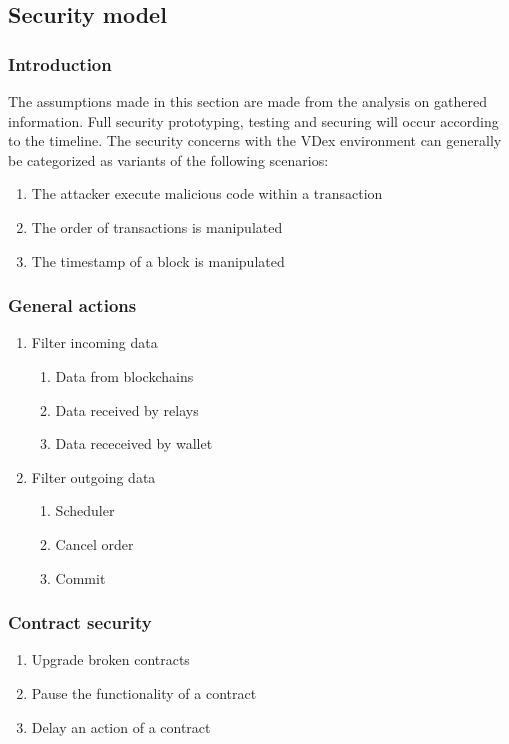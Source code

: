 \documentclass[]{article}
\begin{document}
\subsection{Security model}
\subsubsection{Introduction}
The assumptions made in this section are made from the analysis 
on gathered information.
Full security prototyping, testing and securing will occur according to the timeline. 
The security concerns with the VDex environment can generally be categorized as variants of the following scenarios:
	\begin{enumerate}
		\item The attacker execute malicious code within a transaction
		\item The order of transactions is manipulated
		\item The timestamp of a block is manipulated
	\end{enumerate}
	\subsubsection{General actions}
		\begin{enumerate}	
		\item{Filter incoming data} 
		\begin{enumerate}
			\item Data from blockchains
			\item Data received by relays
			\item Data receceived by wallet
		\end{enumerate}
		\item {Filter outgoing data}
		\begin{enumerate}
			\item Scheduler
			\item Cancel order
			\item Commit
		\end{enumerate}
	\end{enumerate}
		\subsubsection{Contract security}
		\begin{enumerate}
		\item Upgrade broken contracts
		\item Pause the functionality of a contract 
		\item Delay an action of a contract	
		\end{enumerate}
\end{document}
